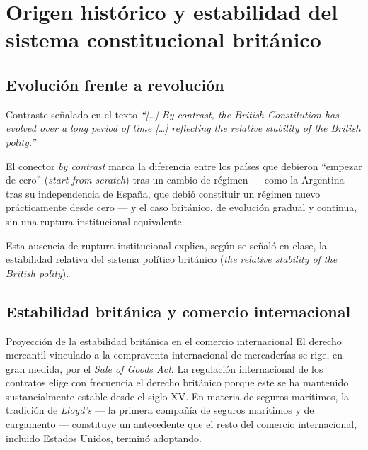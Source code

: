 \documentclass[12pt,oneside]{book}
\begin{document}
\chapter{Origen histórico y estabilidad del sistema constitucional británico}

\section{Evolución frente a revolución}

\begin{example}{Contraste señalado en el texto}
\emph{``[\ldots] By contrast, the British Constitution has evolved over a long period of time [\ldots] reflecting the relative stability of the British polity.''}

El conector \emph{by contrast} marca la diferencia entre los países que debieron ``empezar de cero'' (\emph{start from scratch}) tras un cambio de régimen --- como la Argentina tras su independencia de España, que debió constituir un régimen nuevo prácticamente desde cero --- y el caso británico, de evolución gradual y continua, sin una ruptura institucional equivalente.
\end{example}

Esta ausencia de ruptura institucional explica, según se señaló en clase, la estabilidad relativa del sistema político británico (\emph{the relative stability of the British polity}).

\section{Estabilidad británica y comercio internacional}

\begin{example}{Proyección de la estabilidad británica en el comercio internacional}
El derecho mercantil vinculado a la compraventa internacional de mercaderías se rige, en gran medida, por el \emph{Sale of Goods Act}. La regulación internacional de los contratos elige con frecuencia el derecho británico porque este se ha mantenido sustancialmente estable desde el siglo XV. En materia de seguros marítimos, la tradición de \emph{Lloyd's} --- la primera compañía de seguros marítimos y de cargamento --- constituye un antecedente que el resto del comercio internacional, incluido Estados Unidos, terminó adoptando.
\end{example}
\end{document}
